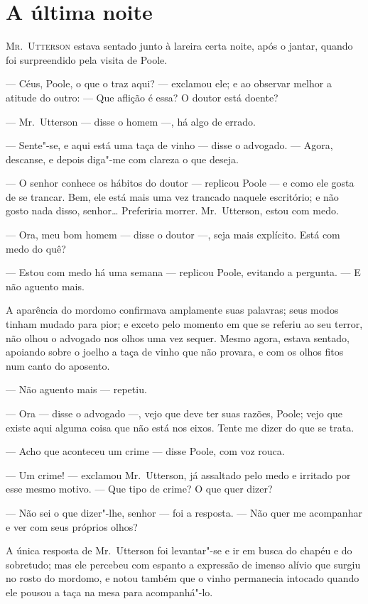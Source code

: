 \chapter[A última noite]{A última noite}

\textsc{Mr.~Utterson} estava sentado junto à lareira certa noite, após o jantar,
quando foi surpreendido pela visita de Poole.

--- Céus, Poole, o que o traz aqui? --- exclamou ele; e ao observar melhor
a atitude do outro: --- Que aflição é essa? O doutor está doente?

--- Mr.~Utterson --- disse o homem ---, há algo de errado.

--- Sente"-se, e aqui está uma taça de vinho --- disse o advogado. --- Agora,
descanse, e depois diga"-me com clareza o que deseja.

--- O senhor conhece os hábitos do doutor --- replicou Poole --- e como ele
gosta de se trancar.  Bem, ele está mais uma vez trancado naquele
escritório; e não gosto nada disso, senhor\ldots{}  Preferiria morrer.  
Mr.~Utterson, estou com medo.

--- Ora, meu bom homem ---  disse o doutor ---, seja mais explícito.  Está
com medo do quê?

--- Estou com medo há uma semana --- replicou Poole, evitando a pergunta.
--- E não aguento mais.

A aparência do mordomo confirmava amplamente suas palavras; seus modos
tinham mudado para pior; e exceto pelo momento em que se referiu ao seu
terror, não olhou o advogado nos olhos uma vez sequer.  Mesmo agora,
estava sentado, apoiando sobre o joelho a taça de vinho que não
provara, e com os olhos fitos num canto do aposento.

--- Não aguento mais --- repetiu.

--- Ora --- disse o advogado ---, vejo que deve ter suas razões, Poole;
vejo que existe aqui alguma coisa que não está nos eixos.  Tente me
dizer do que se trata.

--- Acho que aconteceu um crime --- disse Poole, com voz rouca.

--- Um crime! --- exclamou Mr.~Utterson, já assaltado pelo medo e irritado
por esse mesmo motivo. --- Que tipo de crime?  O que quer dizer?

--- Não sei o que dizer"-lhe, senhor --- foi a resposta. --- Não quer me
acompanhar e ver com seus próprios olhos?

A única resposta de Mr.~Utterson foi levantar"-se e ir em busca do chapéu
e do sobretudo; mas ele percebeu com espanto a expressão de imenso
alívio que surgiu no rosto do mordomo, e notou também que o vinho
permanecia intocado quando ele pousou a taça na mesa para acompanhá"-lo.

